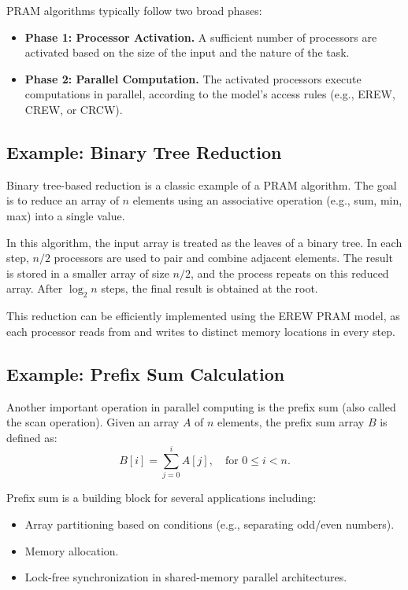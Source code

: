 \documentclass[12pt]{book}
\begin{document}
PRAM algorithms typically follow two broad phases:

\begin{itemize}
    \item \textbf{Phase 1: Processor Activation.} A sufficient number of processors are activated based on the size of the input and the nature of the task.
    \item \textbf{Phase 2: Parallel Computation.} The activated processors execute computations in parallel, according to the model's access rules (e.g., EREW, CREW, or CRCW).
\end{itemize}

\subsection{Example: Binary Tree Reduction}

Binary tree-based reduction is a classic example of a PRAM algorithm. The goal is to reduce an array of $n$ elements using an associative operation (e.g., sum, min, max) into a single value.

In this algorithm, the input array is treated as the leaves of a binary tree. In each step, $n/2$ processors are used to pair and combine adjacent elements. The result is stored in a smaller array of size $n/2$, and the process repeats on this reduced array. After $\log_2 n$ steps, the final result is obtained at the root.

This reduction can be efficiently implemented using the EREW PRAM model, as each processor reads from and writes to distinct memory locations in every step.

\subsection{Example: Prefix Sum Calculation}

Another important operation in parallel computing is the prefix sum (also called the scan operation). Given an array $A$ of $n$ elements, the prefix sum array $B$ is defined as:
\[
B[i] = \sum_{j=0}^{i} A[j], \quad \text{for } 0 \leq i < n.
\]

Prefix sum is a building block for several applications including:
\begin{itemize}
    \item Array partitioning based on conditions (e.g., separating odd/even numbers).
    \item Memory allocation.
    \item Lock-free synchronization in shared-memory parallel architectures.
\end{itemize}
\end{document}
